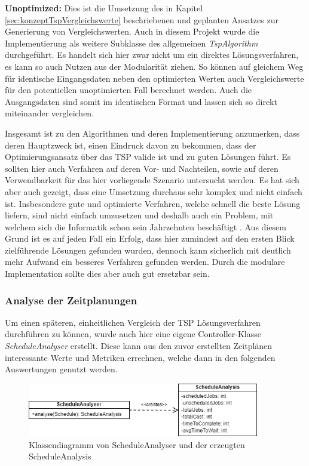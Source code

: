 \textbf{Unoptimized:} Dies ist die Umsetzung des in Kapitel \ref{sec:konzeptTspVergleichswerte} beschriebenen und geplanten Ansatzes zur Generierung von Vergleichswerten. Auch in diesem Projekt wurde die Implementierung als weitere Subklasse des allgemeinen \textit{TspAlgorithm} durchgeführt. Es handelt sich hier zwar nicht um ein direktes Lösungsverfahren, es kann so auch Nutzen aus der Modularität ziehen. So können auf gleichem Weg für identische Eingangsdaten neben den optimierten Werten auch Vergleichswerte für den potentiellen unoptimierten Fall berechnet werden. Auch die Ausgangsdaten sind somit im identischen Format und lassen sich so direkt miteinander vergleichen.

Insgesamt ist zu den Algorithmen und deren Implementierung anzumerken, dass deren Hauptzweck ist, einen Eindruck davon zu bekommen, dass der Optimierungsansatz über das TSP valide ist und zu guten Lösungen führt. Es sollten hier auch Verfahren auf deren Vor- und Nachteilen, sowie auf deren Verwendbarkeit für das hier vorliegende Szenario untersucht werden. Es hat sich aber auch gezeigt, dass eine Umsetzung durchaus sehr komplex und nicht einfach ist. Insbesondere gute und optimierte Verfahren, welche schnell die beste Lösung liefern, sind nicht einfach umzusetzen und deshalb auch ein Problem, mit welchem sich die Informatik schon sein Jahrzehnten beschäftigt \cite{travelingSalesman}. Aus diesem Grund ist es auf jeden Fall ein Erfolg, dass hier zumindest auf den ersten Blick zielführende Lösungen gefunden wurden, dennoch kann sicherlich mit deutlich mehr Aufwand ein besseres Verfahren gefunden werden. Durch die modulare Implementation sollte dies aber auch gut ersetzbar sein.


\subsubsection{Analyse der Zeitplanungen}

Um einen späteren, einheitlichen Vergleich der TSP Lösungsverfahren durchführen zu können, wurde auch hier eine eigene Controller-Klasse \textit{ScheduleAnalyser} erstellt. Diese kann aus den zuvor erstellten Zeitplänen interessante Werte und Metriken errechnen, welche dann in den folgenden Auswertungen genutzt werden.

\begin{figure}[H]
    \centering
    \includegraphics[width=0.9\textwidth]{images/classDiagrams/TSP_ScheduleAnalyser_ClassDiagram.png}
    \caption{Klassendiagramm von ScheduleAnalyser und der erzeugten ScheduleAnalysis}
    \label{fig:tspClassDiagramScheduleAnalyser}
\end{figure}

